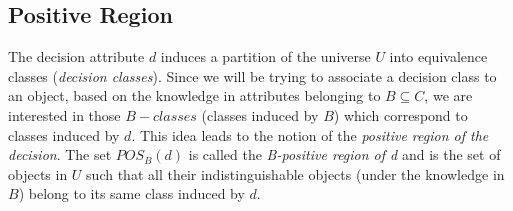 \documentclass[authoryear,11pt]{elsarticle}
\begin{document}
%  
%  
%  
%  
%  
%  
%  
  
\subsection{Positive Region}\label{subsect_Pos}
  The decision attribute $d$ induces a partition of the universe $U$ into equivalence classes 
  (\textit{decision classes}). Since we will be trying to associate a decision class to an object, 
  based on the knowledge in attributes belonging to $B \subseteq C$, we are interested in those 
  $B-classes$ (classes induced by $B$) which correspond to classes induced by $d$. 
  This idea leads to the notion of the  \textit{positive region of the decision}. The set $POS_B(d)$ 
  is called the \textit{B-positive region of d} and is the set of objects in $U$ such that all their
  indistinguishable objects (under the knowledge in $B$) belong to its same class induced by $d$.
  
\end{document}

